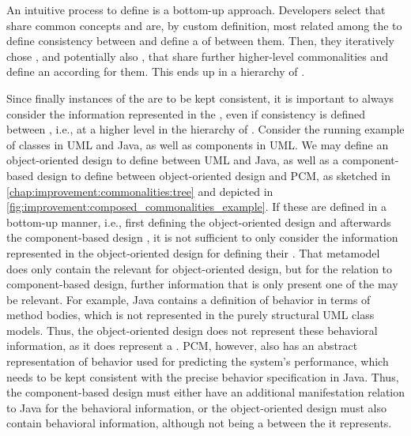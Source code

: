 An intuitive process to define \commonalities is a bottom-up approach.
Developers select \concretemetamodels that share common concepts and are, by custom definition, most related among the \concretemetamodels to define consistency between and define a \conceptmetamodel of \commonalities between them.
Then, they iteratively chose \conceptmetamodels, and potentially also \concretemetamodels, that share further higher-level commonalities and define an according \conceptmetamodel for them.
This ends up in a hierarchy of \conceptmetamodels.

Since finally instances of the \concretemetamodels are to be kept consistent, it is important to always consider the information represented in the \concretemetamodels, even if consistency is defined between \conceptmetamodels, i.e., at a higher level in the hierarchy of \conceptmetamodels.
Consider the running example of classes in \gls{UML} and Java, as well as components in \gls{UML}.
We may define an object-oriented design \conceptmetamodel to define \commonalities between \gls{UML} and Java, as well as a component-based design \conceptmetamodel to define \commonalities between object-oriented design and \gls{PCM}, as sketched in \autoref{chap:improvement:commonalities:tree} and depicted in \autoref{fig:improvement:composed_commonalities_example}.
If these \conceptmetamodels are defined in a bottom-up manner, i.e., first defining the object-oriented design \conceptmetamodel and afterwards the component-based design \conceptmetamodels, it is not sufficient to only consider the information represented in the object-oriented design \conceptmetamodels for defining their \commonalities.
That metamodel does only contain the \commonalities relevant for object-oriented design, but for the relation to component-based design, further information that is only present one of the \concretemetamodels may be relevant.
For example, Java contains a definition of behavior in terms of method bodies, which is not represented in the purely structural \gls{UML} class models.
Thus, the object-oriented design \conceptmetamodel does not represent these behavioral information, as it does represent a \commonality.
\gls{PCM}, however, also has an abstract representation of behavior used for predicting the system's performance, which needs to be kept consistent with the precise behavior specification in Java.
Thus, the component-based design \conceptmetamodel must either have an additional manifestation relation to Java for the behavioral information, or the object-oriented design \conceptmetamodel must also contain behavioral information, although not being a \commonality between the \concretemetamodels it represents.

